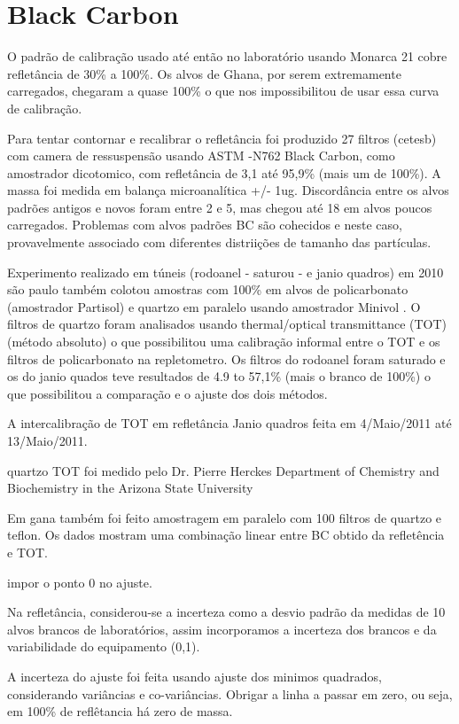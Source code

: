 \section{Black Carbon}

O padrão de calibração usado até então no laboratório usando Monarca 21 cobre refletância de 30\% a 100\%. 
Os alvos de Ghana, por serem extremamente carregados, chegaram a quase 100\% o que nos impossibilitou de usar 
essa curva de calibração.  



Para tentar contornar e recalibrar o refletância foi produzido 27 filtros (cetesb) com camera de ressuspensão
usando ASTM -N762 Black Carbon, como amostrador dicotomico, com refletância de 3,1 até 95,9\% (mais um de 100\%).
A massa foi medida em balança microanalítica +/- 1ug.
Discordância entre os alvos padrões antigos e novos foram entre 2 e 5, mas chegou 
até 18 em alvos poucos carregados. Problemas com alvos padrões BC são cohecidos e 
neste caso, provavelmente associado com diferentes distriições de tamanho das partículas.

Experimento realizado em túneis (rodoanel - saturou - e janio quadros) em 2010 são paulo também colotou amostras com 100\%
em alvos de policarbonato (amostrador Partisol)  e quartzo em paralelo usando amostrador Minivol . 
O filtros de quartzo foram analisados usando thermal/optical transmittance (TOT) (método absoluto) o que
possibilitou uma calibração informal entre o TOT e os filtros de policarbonato na repletometro. 
Os filtros do rodoanel foram saturado e os do janio quados teve resultados de 4.9 to 57,1\% (mais o branco de 100\%)
o que possibilitou a comparação e o ajuste dos dois métodos.  

A intercalibração de TOT em refletância Janio quadros feita em 4/Maio/2011 até 13/Maio/2011.

quartzo TOT foi medido pelo Dr. Pierre Herckes
Department of Chemistry and Biochemistry in the Arizona State University


Em gana também foi feito amostragem em paralelo com 100 filtros de quartzo e teflon. 
Os dados mostram uma combinação linear entre BC obtido da refletência e TOT. 

impor o ponto 0 no ajuste.

Na refletância, considerou-se a incerteza como a desvio padrão da medidas de 10 alvos brancos de laboratórios, 
assim incorporamos a incerteza dos brancos e da variabilidade do equipamento  (0,1). 

A incerteza do ajuste foi feita usando ajuste dos minimos quadrados, considerando
variâncias e co-variâncias. 
Obrigar a linha a passar em zero, ou seja, em 100\% de reflêtancia há zero de massa. 

